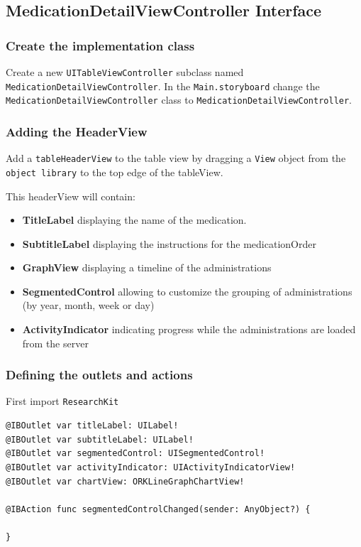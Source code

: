 \documentclass{article}
\begin{document}
\subsection{MedicationDetailViewController Interface}\label{step-7.1---implementing-medicationdetailviewcontroller---medicationdetailviewcontroller-interface}

\subsubsection{Create the implementation class}\label{create-the-implementation-class}

Create a new \texttt{UITableViewController} subclass named
\texttt{MedicationDetailViewController}. In the \texttt{Main.storyboard}
change the \texttt{MedicationDetailViewController} class to
\texttt{MedicationDetailViewController}.

\subsubsection{Adding the HeaderView}\label{adding-the-headerview}

Add a \texttt{tableHeaderView} to the table view by dragging a
\texttt{View} object from the \texttt{object\ library} to the top edge
of the tableView.

This headerView will contain:
\begin{itemize}
\item
  \textbf{TitleLabel} displaying the name of the medication.
\item
  \textbf{SubtitleLabel} displaying the instructions for the medicationOrder
\item
  \textbf{GraphView} displaying a timeline of the administrations
\item
  \textbf{SegmentedControl} allowing to customize the grouping of administrations (by year, month, week or day)
\item
\textbf{ActivityIndicator} indicating progress while the administrations are loaded from the server
\end{itemize}


\subsubsection{Defining the outlets and actions}\label{step7:defining-the-outlets-and-actions}
First import \texttt{ResearchKit}

\begin{verbatim}
@IBOutlet var titleLabel: UILabel!
@IBOutlet var subtitleLabel: UILabel!
@IBOutlet var segmentedControl: UISegmentedControl!
@IBOutlet var activityIndicator: UIActivityIndicatorView!
@IBOutlet var chartView: ORKLineGraphChartView!

@IBAction func segmentedControlChanged(sender: AnyObject?) {

}
\end{verbatim}
\end{document}
